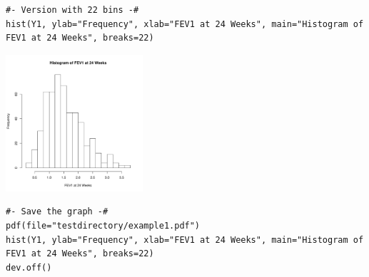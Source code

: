 \documentclass[11pt,letterpaper,fleqn]{report}
\begin{document}
\begin{enumerate}[]
{\begin{verbatim}
#- Version with 22 bins -#
hist(Y1, ylab="Frequency", xlab="FEV1 at 24 Weeks", main="Histogram of FEV1 at 24 Weeks", breaks=22)
\end{verbatim}}
\includegraphics[height=2in, width=2in]{fev1hist_R2.pdf}
{\scriptsize
\begin{verbatim}
#- Save the graph -#
pdf(file="testdirectory/example1.pdf")
hist(Y1, ylab="Frequency", xlab="FEV1 at 24 Weeks", main="Histogram of FEV1 at 24 Weeks", breaks=22)
dev.off()
\end{verbatim}}
\end{enumerate}
\end{document}

